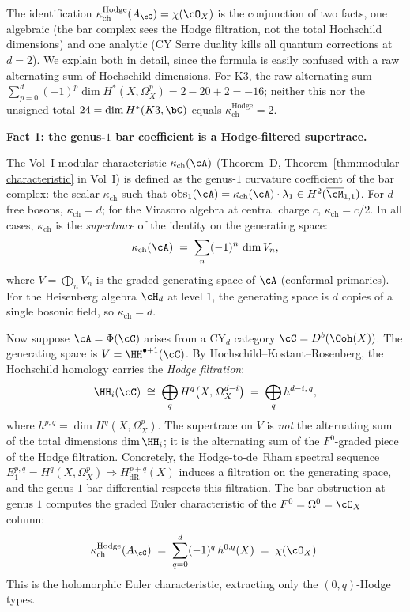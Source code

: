 \begin{remark}[Why \texorpdfstring{$\kappa_{\mathrm{ch}}^{\mathrm{Hodge}} = \chi(\cO_X)$}{kappa-ch-Hodge = chi(O-X)} and not \texorpdfstring{$\sum (-1)^i \dim \HH_i$}{sum (-1)-i dim HH-i}: the Hodge filtration mechanism]
\label{rem:kappa-hodge-mechanism}
The identification $\kappa_{\mathrm{ch}}^{\mathrm{Hodge}}(A_\cC) = \chi(\cO_X)$ is the conjunction of two facts, one algebraic (the bar complex sees the Hodge filtration, not the total Hochschild dimensions) and one analytic (CY Serre duality kills all quantum corrections at $d = 2$). We explain both in detail, since the formula is easily confused with a raw alternating sum of Hochschild dimensions. For K3, the raw alternating sum $\sum_{p=0}^{d}(-1)^p \dim H^*(X, \Omega^p_X) = 2 - 20 + 2 = -16$; neither this nor the unsigned total $24 = \dim H^*(K3, \bC)$ equals $\kappa_{\mathrm{ch}}^{\mathrm{Hodge}} = 2$.

\medskip\noindent
\textbf{Fact 1: the genus-$1$ bar coefficient is a Hodge-filtered supertrace.}

\smallskip\noindent
The Vol~I modular characteristic $\kappa_{\mathrm{ch}}(\cA)$ (Theorem~D, Theorem~\ref{thm:modular-characteristic} in Vol~I) is defined as the genus-$1$ curvature coefficient of the bar complex: the scalar $\kappa_{\mathrm{ch}}$ such that $\mathrm{obs}_1(\cA) = \kappa_{\mathrm{ch}}(\cA) \cdot \lambda_1 \in H^2(\overline{\cM}_{1,1})$. For $d$ free bosons, $\kappa_{\mathrm{ch}} = d$; for the Virasoro algebra at central charge $c$, $\kappa_{\mathrm{ch}} = c/2$. In all cases, $\kappa_{\mathrm{ch}}$ is the \emph{supertrace} of the identity on the generating space:
\[
 \kappa_{\mathrm{ch}}(\cA) \;=\; \sum_{n} (-1)^n\, \dim V_n,
\]
where $V = \bigoplus_n V_n$ is the graded generating space of $\cA$ (conformal primaries). For the Heisenberg algebra $\cH_d$ at level $1$, the generating space is $d$ copies of a single bosonic field, so $\kappa_{\mathrm{ch}} = d$.

Now suppose $\cA = \Phi(\cC)$ arises from a CY$_d$ category $\cC = D^b(\Coh(X))$. The generating space is $V = \HH^{\bullet+1}(\cC)$. By Hochschild--Kostant--Rosenberg, the Hochschild homology carries the \emph{Hodge filtration}:
\[
 \HH_i(\cC) \;\cong\; \bigoplus_{q} H^q\bigl(X,\, \Omega_X^{d-i}\bigr) \;=\; \bigoplus_q h^{d-i,\,q},
\]
where $h^{p,q} = \dim H^q(X, \Omega^p_X)$. The supertrace on $V$ is \emph{not} the alternating sum of the total dimensions $\dim \HH_i$; it is the alternating sum of the $F^0$-graded piece of the Hodge filtration. Concretely, the Hodge-to-de~Rham spectral sequence $E_1^{p,q} = H^q(X, \Omega^p_X) \Rightarrow H^{p+q}_{\mathrm{dR}}(X)$ induces a filtration on the generating space, and the genus-$1$ bar differential respects this filtration. The bar obstruction at genus $1$ computes the graded Euler characteristic of the $F^0 = \Omega^0 = \cO_X$ column:
\begin{equation}\label{eq:kappa-hodge-filtered}
 \kappa_{\mathrm{ch}}^{\mathrm{Hodge}}(A_\cC) \;=\; \sum_{q=0}^{d} (-1)^q\, h^{0,q}(X) \;=\; \chi(\cO_X).
\end{equation}
This is the holomorphic Euler characteristic, extracting only the $(0,q)$-Hodge types.


\end{remark}
